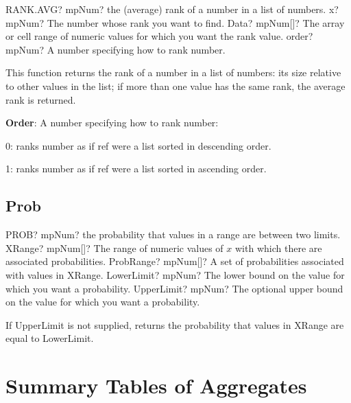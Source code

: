 \vspace{0.6cm}
\begin{mpFunctionsExtract}
	\mpWorksheetFunctionThreeNotImplemented
	{RANK.AVG? mpNum? the (average) rank of a number in a list of numbers.}
	{x? mpNum? The number whose rank you want to find.}
	{Data? mpNum[]?  The array or cell range of numeric values for which you want the rank value.}
	{order? mpNum? A number specifying how to rank number.}
\end{mpFunctionsExtract}

\vspace{0.3cm}
This function returns the rank of a number in a list of numbers: its size relative to other values in the list; if more than one value has the same rank, the average rank is returned.


\vspace{0.3cm}
\textbf{\textsf{Order}}: A number specifying how to rank number:

0: ranks number as if ref were a list sorted in descending order.

1: ranks number as if ref were a list sorted in ascending order. 







\subsection{Prob}

\begin{mpFunctionsExtract}
	\mpWorksheetFunctionFourNotImplemented
	{PROB? mpNum? the probability that values in a range are between two limits.}
	{XRange? mpNum[]? The range of numeric values of $x$ with which there are associated probabilities.}
	{ProbRange? mpNum[]?  A set of probabilities associated with values in \textsf{XRange}.}
	{LowerLimit? mpNum? The lower bound on the value for which you want a probability.}
	{UpperLimit? mpNum? The optional upper bound on the value for which you want a probability.}
\end{mpFunctionsExtract}

\vspace{0.3cm}
If \textsf{UpperLimit} is not supplied, returns the probability that values in \textsf{XRange} are equal to \textsf{LowerLimit}.





\newpage
\section{Summary Tables of Aggregates}



